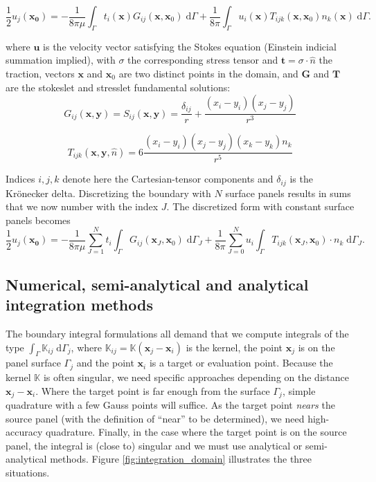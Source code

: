 \documentclass[final,leqno,]{siamltex1213}
\newcommand{\K}{\mathbb{K}}
\newcommand{\di}[1]{\text{d}#1}
\newcommand{\nhat}{\hat{n}}
\newcommand{\vect}[1]{\mathbf{#1}}
\begin{document}
\begin{equation}
	\label{eqn:stokes_bem_12}
	\frac{1}{2}u_j(\vect{x_0}) = -\frac{1}{8\pi\mu}\int_{\Gamma} t_i(\vect{x})G_{ij}(\vect{x},\vect{x}_0)\;\di{\Gamma} + \frac{1}{8\pi} \int_{\Gamma} u_i(\vect{x})T_{ijk}(\vect{x},\vect{x}_0)n_k(\vect{x})\;\di{\Gamma}.
\end{equation}

\noindent where $\vect{u}$ is the velocity vector satisfying the Stokes equation (Einstein indicial summation implied), with $\sigma$ the corresponding stress tensor and $\vect{t} = \sigma\cdot\nhat$  the traction, vectors $\vect{x}$ and $\vect{x}_0$ are two distinct points in the domain, and $\vect{G}$ and $\vect{T}$ are the stokeslet and stresslet fundamental solutions:
%
\begin{equation}
	\label{eqn:stokeslet}
	G_{ij}(\vect{x},\vect{y})=S_{ij}(\vect{x},\vect{y})  =  \frac{\delta_{ij}}{r} + \frac{(x_i-y_i)(x_j-y_j)}{r^{3}} 
\end{equation}

\begin{equation}
	\label{eqn:stresslet}
	T_{ijk}(\vect{x},\vect{y},\nhat)  =  6\frac{(x_i-y_i)(x_j-y_j)(x_k-y_k)n_k}{r^{5}} \end{equation}

Indices $i, j, k$ denote here the Cartesian-tensor components and $\delta_{ij}$ is the Kr{\"o}necker delta. Discretizing the boundary with $N$ surface panels results in sums that we now number with the index $J$.
The discretized form with constant surface panels becomes
%
\begin{equation}
	\label{eqn:stokes_bem_discretized}
	\frac{1}{2}u_j(\vect{x_0}) = -\frac{1}{8\pi\mu}\sum_{J=1}^{N}t_i\int_{\Gamma} G_{ij}(\vect{x}_J, \vect{x}_0)\;\di{\Gamma_J} + \frac{1}{8\pi} \sum_{J=0}^{N}u_i\int_{\Gamma} T_{ijk}(\vect{x}_J, \vect{x}_0)\cdot n_k\;\di{\Gamma_J}.
\end{equation}


\subsection{Numerical, semi-analytical and analytical integration methods}

The boundary integral formulations all demand that we compute integrals of the type $\int_{\Gamma} \K_{ij}\;\di{\Gamma_j}$, where $\K_{ij}=\K(\vect{x}_j-\vect{x}_i)$ is the kernel, the point $\vect{x}_j$ is on the panel surface $\Gamma_j$ and the point $\vect{x}_i$ is a target or evaluation point. Because the kernel $\K$ is often singular, we need specific approaches depending on the distance $\vect{x}_j-\vect{x}_i$. Where the target point is far enough from the surface $\Gamma_j$, simple quadrature with a few Gauss points will suffice. As the target point \emph{nears} the source panel (with the definition of ``near'' to be determined), we need high-accuracy quadrature. Finally, in the case where the target point is on the source panel, the integral is (close to) singular and we must use analytical or semi-analytical methods. Figure \ref{fig:integration_domain} illustrates the three situations.
\end{document}

